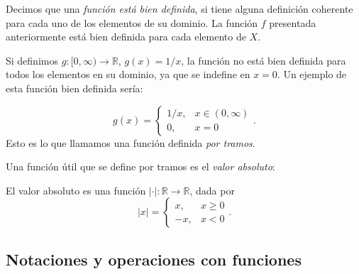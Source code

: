 \documentclass[12pt]{book}
\begin{document}
Decimos que una \textit{función está bien definida}, si tiene alguna definición coherente para cada uno de los elementos de su dominio. La función $f$ presentada anteriormente está bien definida para cada elemento de $X$.

\begin{exampleenv}
Si definimos $g:[0,\infty)\rightarrow \mathbb{R}$, $g(x)=1/x$, la función no está bien definida para todos los elementos en su dominio, ya que se indefine en $x=0$. Un ejemplo de esta función bien definida sería:

\[
g(x) =
\begin{cases}
    1/x, &  x \in (0,\infty) \\
    0, & x = 0
\end{cases}.
\]
Esto es lo que llamamos una función definida \textit{por tramos}.
\end{exampleenv}

Una función útil que se define por tramos es el \emph{valor absoluto}:

\begin{definitionenv}
    El valor absoluto es una función $|\cdot|:\mathbb{R\to\mathbb{R}}$, dada por
    \[
    |x|=
    \begin{cases}
        x,&x\ge 0\\
        -x, &x<0
    \end{cases}.
    \]
\end{definitionenv}

\subsection{Notaciones y operaciones con funciones}\label{sec:operaciones_fun}
\end{document}
